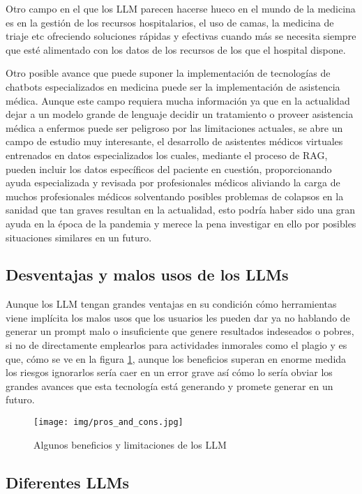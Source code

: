 Otro campo en el que los LLM parecen hacerse hueco en el mundo de la medicina es en la gestión de los recursos hospitalarios, el uso de camas, la medicina de triaje etc ofreciendo soluciones rápidas y efectivas cuando más se necesita siempre que esté alimentado con los datos de los recursos de los que el hospital dispone.

Otro posible avance que puede suponer la implementación de tecnologías de chatbots especializados en medicina puede ser la implementación de asistencia médica. Aunque este campo requiera mucha información ya que en la actualidad dejar a un modelo grande de lenguaje decidir un tratamiento o proveer asistencia médica a enfermos puede ser peligroso por las limitaciones actuales, se abre un campo de estudio muy interesante, el desarrollo de asistentes médicos virtuales entrenados en datos especializados los cuales, mediante el proceso de RAG, pueden incluir los datos específicos del paciente en cuestión, proporcionando ayuda especializada y revisada por profesionales médicos aliviando la carga de muchos profesionales médicos solventando posibles problemas de colapsos en la sanidad que tan graves resultan en la actualidad, esto podría haber sido una gran ayuda en la época de la pandemia y merece la pena investigar en ello por posibles situaciones similares en un futuro.


\subsection{Desventajas y malos usos de los LLMs}

Aunque los LLM tengan grandes ventajas en su condición cómo herramientas viene implícita los malos usos que los usuarios les pueden dar ya no hablando de generar un prompt malo o insuficiente que genere resultados indeseados o pobres, si no de directamente emplearlos para actividades inmorales como el plagio y es que, cómo se ve en la figura \ref{fig:prosandcons}, aunque los beneficios superan en enorme medida los riesgos ignorarlos sería caer en un error grave así cómo lo sería obviar los grandes avances que esta tecnología está generando y promete generar en un futuro.

\begin{figure}[h]
    \centering
    \texttt{[image: img/pros\_and\_cons.jpg]}
    \caption{Algunos beneficios y limitaciones de los LLM}
    \label{fig:prosandcons}
\end{figure}

\subsection{Diferentes LLMs}

